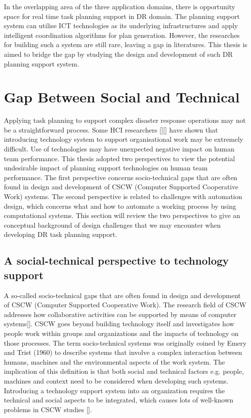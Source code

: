 In the overlapping area of the three application domains, there is opportunity space for real time task planning support in DR domain. The planning support system can utilise ICT technologies as its underlying infrastructures and apply intelligent coordination algorithms for plan generation. However, the researches for building such a system are still rare, leaving a gap in literatures. This thesis is aimed to bridge the gap by studying the design and development of such DR planning support system.\\

\section{Gap Between Social and Technical}
Applying task planning to support complex disaster response operations may not be a straightforward process. Some HCI researchers [][] have shown that introducing technology system to support organisational work may be extremely difficult. Use of technologies may have unexpected negative impact on human team performance. This thesis adopted two perspectives to view the potential undesirable impact of planning support technologies on human team performance. The first perspective concerns socio-technical gaps that are often found in design and development of CSCW (Computer Supported Cooperative Work) systems. The second perspective is related to challenges with automation design, which concerns what and how to automate a working process by using computational systems. This section will review the two perspectives to give an conceptual background of design challenges that we may encounter when developing DR task planning support.\\


\subsection{A social-technical perspective to technology support}
A so-called socio-technical gaps that are often found in design and development of CSCW (Computer Supported Cooperative Work). The research field of CSCW addresses how collaborative activities can be supported by means of computer systems[].  CSCW goes beyond building technology itself and investigates how people work within groups and organizations and the impacts of technology on those processes. The term socio-technical systems was originally coined by Emery and Trist (1960) to describe systems that involve a complex interaction between humans, machines and the environmental aspects of the work system. The implication of this definition is that both social and technical factors e.g. people, machines and context need to be considered when developing such systems. Introducing a technology support system into an organization requires the technical and social aspects to be integrated, which causes lots of well-known problems in CSCW studies []. \\



